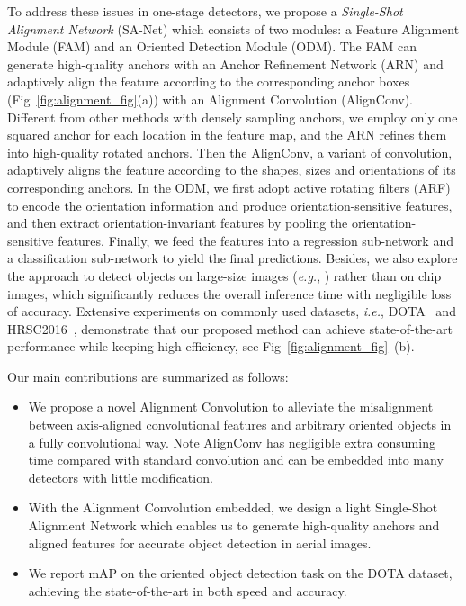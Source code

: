 \documentclass[10pt,journal,final]{IEEEtran}
\def\eg{{\em e.g.}}
\def\ie{{\em i.e.}}
\begin{document}
To address these issues in one-stage detectors, we propose a {\em Single-Shot Alignment Network} (SA-Net) which consists of two modules: a Feature Alignment Module (FAM) and an Oriented Detection Module (ODM). The FAM can generate high-quality anchors with an Anchor Refinement Network (ARN) and adaptively align the feature according to the corresponding anchor boxes (Fig~\ref{fig:alignment_fig}(a)) with an Alignment Convolution (AlignConv). Different from other methods with densely sampling anchors, we employ only one squared anchor for each location in the feature map, and the ARN refines them into high-quality rotated anchors. Then the AlignConv, a variant of convolution, adaptively aligns the feature according to the shapes, sizes and orientations of its corresponding anchors. In the ODM, we first adopt active rotating filters (ARF)~\cite{zhou2017orn} to encode the orientation information and produce orientation-sensitive features, and then extract orientation-invariant features by pooling the orientation-sensitive features. Finally, we feed the features into a regression sub-network and a classification sub-network to yield the final predictions. Besides, we also explore the approach to detect objects on large-size images (\eg, ) rather than on chip images, which significantly reduces the overall inference time with negligible loss of accuracy. Extensive experiments on commonly used datasets, \ie, DOTA~\cite{xia2018dota} and HRSC2016~\cite{liu2017hrsc2016}, demonstrate that our proposed method can achieve state-of-the-art performance while keeping high efficiency, see Fig~\ref{fig:alignment_fig}~(b). 

Our main contributions are summarized as follows:
\begin{itemize}
  \item We propose a novel Alignment Convolution to alleviate the misalignment between axis-aligned convolutional features and arbitrary oriented objects in a fully convolutional way. Note AlignConv has negligible extra consuming time compared with standard convolution and can be embedded into many detectors with little modification.
  \item With the Alignment Convolution embedded, we design a light Single-Shot Alignment Network which enables us to generate high-quality anchors and aligned features for accurate object detection in aerial images.
  \item We report  mAP on the oriented object detection task on the DOTA dataset, achieving the state-of-the-art in both speed and accuracy.
\end{itemize}
\end{document}
